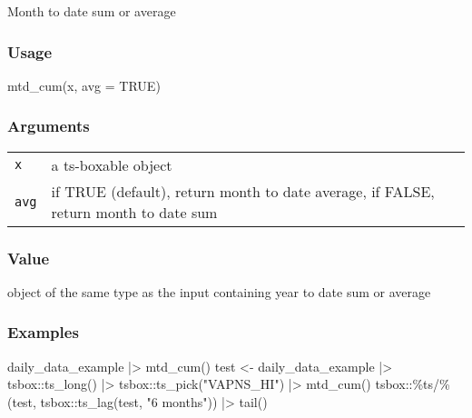 \documentclass[
  letterpaper,
  DIV=11,
  numbers=noendperiod]{scrreport}
\newenvironment{Shaded}{\begin{snugshade}}{\end{snugshade}}
\newcommand{\AttributeTok}[1]{\textcolor[rgb]{0.40,0.45,0.13}{#1}}
\newcommand{\ConstantTok}[1]{\textcolor[rgb]{0.56,0.35,0.01}{#1}}
\newcommand{\FunctionTok}[1]{\textcolor[rgb]{0.28,0.35,0.67}{#1}}
\newcommand{\NormalTok}[1]{\textcolor[rgb]{0.00,0.23,0.31}{#1}}
\newcommand{\OtherTok}[1]{\textcolor[rgb]{0.00,0.23,0.31}{#1}}
\newcommand{\SpecialCharTok}[1]{\textcolor[rgb]{0.37,0.37,0.37}{#1}}
\newcommand{\StringTok}[1]{\textcolor[rgb]{0.13,0.47,0.30}{#1}}
\begin{document}
Month to date sum or average

\subsubsection{Usage}\label{usage-39}

\begin{Shaded}
\begin{Highlighting}[]
\FunctionTok{mtd\_cum}\NormalTok{(x, }\AttributeTok{avg =} \ConstantTok{TRUE}\NormalTok{)}
\end{Highlighting}
\end{Shaded}

\subsubsection{Arguments}\label{arguments-39}

\begin{longtable}[]{@{}ll@{}}
\toprule\noalign{}
\endhead
\bottomrule\noalign{}
\endlastfoot
\texttt{x} & a ts-boxable object \\
\texttt{avg} & if TRUE (default), return month to date average, if
FALSE, return month to date sum \\
\end{longtable}

\subsubsection{Value}\label{value-39}

object of the same type as the input containing year to date sum or
average

\subsubsection{Examples}\label{examples-39}

\begin{Shaded}
\begin{Highlighting}[]
\NormalTok{daily\_data\_example }\SpecialCharTok{|\textgreater{}}
  \FunctionTok{mtd\_cum}\NormalTok{()}
\NormalTok{test }\OtherTok{\textless{}{-}}\NormalTok{ daily\_data\_example }\SpecialCharTok{|\textgreater{}}
\NormalTok{  tsbox}\SpecialCharTok{::}\FunctionTok{ts\_long}\NormalTok{() }\SpecialCharTok{|\textgreater{}}
\NormalTok{  tsbox}\SpecialCharTok{::}\FunctionTok{ts\_pick}\NormalTok{(}\StringTok{"VAPNS\_HI"}\NormalTok{) }\SpecialCharTok{|\textgreater{}}
  \FunctionTok{mtd\_cum}\NormalTok{()}
\NormalTok{tsbox}\SpecialCharTok{::}\StringTok{\textasciigrave{}}\AttributeTok{\%ts/\%}\StringTok{\textasciigrave{}}\NormalTok{(test, tsbox}\SpecialCharTok{::}\FunctionTok{ts\_lag}\NormalTok{(test, }\StringTok{"6 months"}\NormalTok{)) }\SpecialCharTok{|\textgreater{}} \FunctionTok{tail}\NormalTok{()}
\end{Highlighting}
\end{Shaded}
\end{document}
